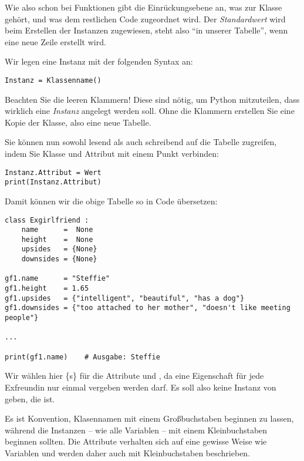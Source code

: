 Wie also schon bei Funktionen gibt die Einrückungsebene an, was zur Klasse gehört, und was dem restlichen Code zugeordnet wird. Der \emph{Standardwert} wird beim Erstellen der Instanzen zugewiesen, steht also \enquote{in unserer Tabelle}, wenn eine neue Zeile erstellt wird.

Wir legen eine Instanz mit der folgenden Syntax an:
\begin{codebox}
\begin{verbatim}
Instanz = Klassenname()
\end{verbatim}
\end{codebox}

Beachten Sie die leeren Klammern! Diese sind nötig, um Python mitzuteilen, dass wirklich eine \emph{Instanz} angelegt werden soll. Ohne die Klammern erstellen Sie eine Kopie der Klasse, also eine neue Tabelle.

Sie können nun sowohl lesend als auch schreibend auf die Tabelle zugreifen, indem Sie Klasse und Attribut mit einem Punkt verbinden:
\begin{codebox}
\begin{verbatim}
Instanz.Attribut = Wert
print(Instanz.Attribut)
\end{verbatim}
\end{codebox}

Damit können wir die obige Tabelle so in Code übersetzen:
\begin{codebox}
\begin{verbatim}
class Exgirlfriend :
    name      =  None
    height    =  None
    upsides   = {None}
    downsides = {None}

gf1.name      = "Steffie"
gf1.height    = 1.65
gf1.upsides   = {"intelligent", "beautiful", "has a dog"}
gf1.downsides = {"too attached to her mother", "doesn't like meeting people"}

...

print(gf1.name)    # Ausgabe: Steffie
\end{verbatim}
\end{codebox}

Wir wählen hier \{s\} für die Attribute  und , da eine Eigenschaft für jede Exfreundin nur einmal vergeben werden darf. Es soll also keine Instanz von  geben, die  ist.

\begin{hintbox}
Es ist Konvention, Klasennamen mit einem Großbuchstaben beginnen zu lassen, während die Instanzen -- wie alle Variablen -- mit einem Kleinbuchstaben beginnen sollten. Die Attribute verhalten sich auf eine gewisse Weise wie Variablen und werden daher auch mit Kleinbuchstaben beschrieben.
\end{hintbox}

